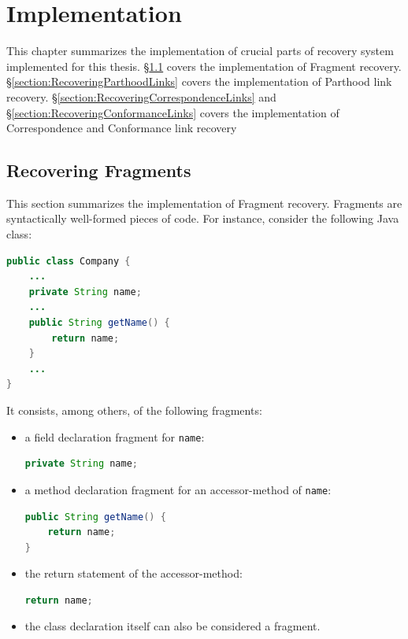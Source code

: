 \chapter{Implementation}
\label{chapter:Implementation}
This chapter summarizes the implementation of crucial parts of recovery system implemented for this thesis.
§\ref{section:RecoveringFragments} covers the implementation of \gls{Fragment} recovery.
§\ref{section:RecoveringParthoodLinks} covers the implementation of \gls{Parthood} link recovery.
§\ref{section:RecoveringCorrespondenceLinks} and §\ref{section:RecoveringConformanceLinks} covers the implementation of \gls{Correspondence} and \gls{Conformance} link recovery

\section{Recovering Fragments}
\label{section:RecoveringFragments}
This section summarizes the implementation of \gls{Fragment} recovery.
\Glspl{Fragment} are syntactically well-formed pieces of code.
For instance, consider the following \gls{Java} class:
\begin{lstlisting}[language=Java,numbers=none]
public class Company {
	...
	private String name;
	...
	public String getName() {
		return name;
	}
	...
}
\end{lstlisting}
It consists, among others, of the following fragments:
\begin{itemize}
\item
a field declaration fragment for \texttt{name}:
\begin{lstlisting}[language=Java,numbers=none]
private String name;
\end{lstlisting}
\item
a method declaration fragment for an accessor-method of \texttt{name}:
\begin{lstlisting}[language=Java,numbers=none]
public String getName() {
	return name;
}
\end{lstlisting}
\item
the return statement of the accessor-method:
\begin{lstlisting}[language=Java,numbers=none]
return name;
\end{lstlisting}
\item
the class declaration itself can also be considered a fragment.
\end{itemize}

